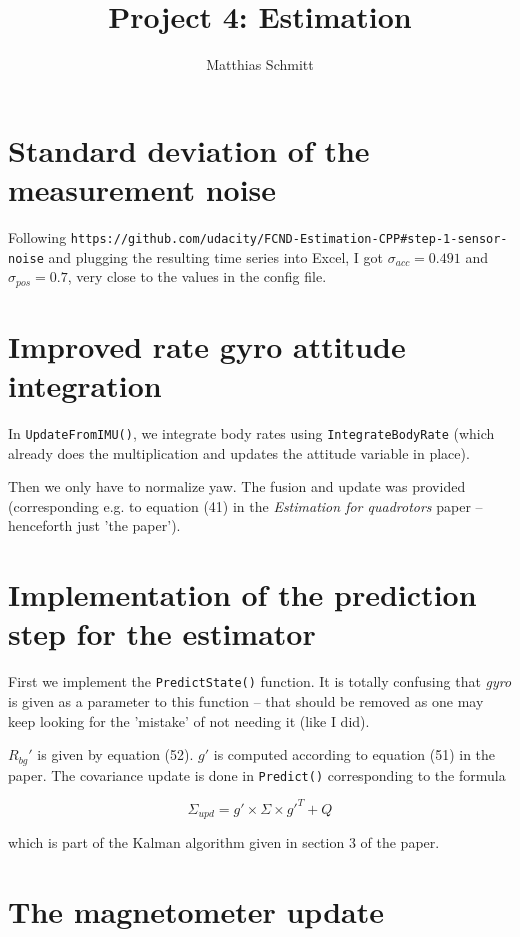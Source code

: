 \documentclass[12pt]{article}
\begin{document}
\title{Project 4: Estimation}%
\author{Matthias Schmitt}%


\maketitle


\section{Standard deviation of the measurement noise}

Following \verb+https://github.com/udacity/FCND-Estimation-CPP#step-1-sensor-noise+ and plugging the resulting time series
into Excel, I got $\sigma_{acc} = 0.491$ and $\sigma_{pos} = 0.7$, very close to the values in the config file.

\section{Improved rate gyro attitude integration}

In \verb+UpdateFromIMU()+, we integrate body rates using \verb+IntegrateBodyRate+ (which already does the multiplication and updates the attitude variable in place).

Then we only have to normalize yaw. The fusion and update was provided (corresponding e.g. to equation (41) in the \emph{Estimation for quadrotors} paper -- henceforth just 'the paper').

\section{Implementation of the prediction step for the estimator}

First we implement the \verb+PredictState()+ function. It is totally confusing that \emph{gyro} is given as a parameter to this function -- that should be removed as one may keep looking for the 'mistake' of not needing it (like I did).

$R_{bg}'$ is given by equation (52). $g'$ is computed according to equation (51) in the paper. The covariance update is done in \verb+Predict()+ corresponding to the formula

$$\Sigma_{upd} = g' \times \Sigma \times g'^T + Q$$

which is part of the Kalman algorithm given in section 3 of the paper.


\section{The magnetometer update}
\end{document}
